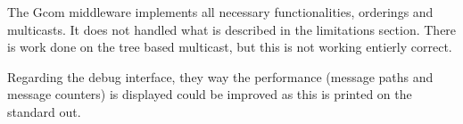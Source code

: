 The Gcom middleware implements all necessary functionalities, orderings and multicasts.
It does not handled what is described in the limitations section.
There is work done on the tree based multicast, but this is not working entierly correct.

Regarding the debug interface, they way the performance (message paths and message counters) is displayed could be improved as this is printed on the standard out.
